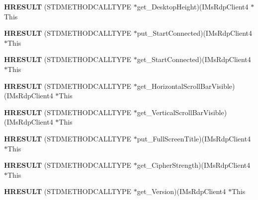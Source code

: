 \begin{DoxyCompactItemize}
{\bfseries H\+R\+E\+S\+U\+LT} (S\+T\+D\+M\+E\+T\+H\+O\+D\+C\+A\+L\+L\+T\+Y\+PE $\ast$get\+\_\+\+Desktop\+Height)(I\+Ms\+Rdp\+Client4 $\ast$This
\item 
\mbox{\label{struct_i_ms_rdp_client4_vtbl_aed2d16a45646c096a74ac34cefdb9cdf}} 
{\bfseries H\+R\+E\+S\+U\+LT} (S\+T\+D\+M\+E\+T\+H\+O\+D\+C\+A\+L\+L\+T\+Y\+PE $\ast$put\+\_\+\+Start\+Connected)(I\+Ms\+Rdp\+Client4 $\ast$This
\item 
\mbox{\label{struct_i_ms_rdp_client4_vtbl_ade59ed7f07f1ba9af7b961f3f757e694}} 
{\bfseries H\+R\+E\+S\+U\+LT} (S\+T\+D\+M\+E\+T\+H\+O\+D\+C\+A\+L\+L\+T\+Y\+PE $\ast$get\+\_\+\+Start\+Connected)(I\+Ms\+Rdp\+Client4 $\ast$This
\item 
\mbox{\label{struct_i_ms_rdp_client4_vtbl_aab6fb4edbc88940ebc515d7a3041dd5c}} 
{\bfseries H\+R\+E\+S\+U\+LT} (S\+T\+D\+M\+E\+T\+H\+O\+D\+C\+A\+L\+L\+T\+Y\+PE $\ast$get\+\_\+\+Horizontal\+Scroll\+Bar\+Visible)(I\+Ms\+Rdp\+Client4 $\ast$This
\item 
\mbox{\label{struct_i_ms_rdp_client4_vtbl_a29a863586700c1188fb907566713a407}} 
{\bfseries H\+R\+E\+S\+U\+LT} (S\+T\+D\+M\+E\+T\+H\+O\+D\+C\+A\+L\+L\+T\+Y\+PE $\ast$get\+\_\+\+Vertical\+Scroll\+Bar\+Visible)(I\+Ms\+Rdp\+Client4 $\ast$This
\item 
\mbox{\label{struct_i_ms_rdp_client4_vtbl_aa6f37d57729668432881d0629b91777f}} 
{\bfseries H\+R\+E\+S\+U\+LT} (S\+T\+D\+M\+E\+T\+H\+O\+D\+C\+A\+L\+L\+T\+Y\+PE $\ast$put\+\_\+\+Full\+Screen\+Title)(I\+Ms\+Rdp\+Client4 $\ast$This
\item 
\mbox{\label{struct_i_ms_rdp_client4_vtbl_a0fd53ef07e12e27e0e0e42dafbd78da7}} 
{\bfseries H\+R\+E\+S\+U\+LT} (S\+T\+D\+M\+E\+T\+H\+O\+D\+C\+A\+L\+L\+T\+Y\+PE $\ast$get\+\_\+\+Cipher\+Strength)(I\+Ms\+Rdp\+Client4 $\ast$This
\item 
\mbox{\label{struct_i_ms_rdp_client4_vtbl_adb70e4c361e382e96deffc4c77e2fbf7}} 
{\bfseries H\+R\+E\+S\+U\+LT} (S\+T\+D\+M\+E\+T\+H\+O\+D\+C\+A\+L\+L\+T\+Y\+PE $\ast$get\+\_\+\+Version)(I\+Ms\+Rdp\+Client4 $\ast$This
\item 

\end{DoxyCompactItemize}

